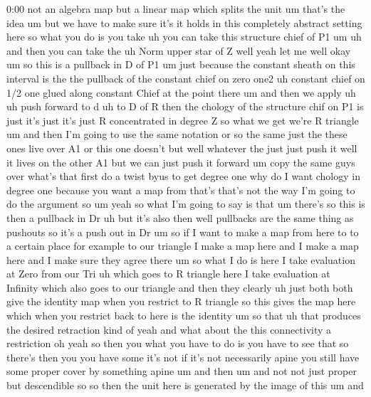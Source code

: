 \begin{unfinished}{0:00}
not  an  algebra  map  but  a  linear  map
which  splits  the  unit  um  that's  the  idea
um  but  we  have  to  make  sure  it's  it
holds  in  this  completely  abstract
setting  here  so  what  you  do  is  you  take
uh  you  can  take  this  structure  chief  of
P1
um  uh  and  then  you  can  take  the  uh  Norm
upper  star  of  Z  well  yeah  let
me  well
okay
um  so  this  is  a
pullback  in  D  of
P1
um  just  because  the  constant  sheath  on
this  interval  is  the  the  pullback  of  the
constant  chief  on  zero  one2  uh  constant
chief  on  1/2  one  glued  along  constant
Chief  at  the  point
there  um  and  then  we  apply  uh
uh  push  forward  to
d  uh  to  D  of
R  then  the  chology  of  the  structure  chif
on  P1  is  just  it's  just  it's  just  R
concentrated  in  degree  Z  so  what  we  get
we're  R
triangle  um  and  then  I'm  going  to  use
the  same  notation  or  so  the  same  just
the  these  ones  live  over  A1  or  this  one
doesn't  but  well  whatever  the  just  just
push  it  well  it  lives  on  the  other  A1
but  we  can  just  push  it  forward
um  copy  the  same  guys
over  what's
that  first  do  a  twist  byus  to  get  degree
one  why  do  I  want  chology  in  degree
one  because  you  want  a  map
from  that's  that's  not  the  way  I'm  going
to  do  the  argument  so  um  yeah  so  what
I'm  going  to  say  is  that  um  there's  so
this  is  then  a  pullback  in  Dr  uh  but
it's  also  then  well  pullbacks  are  the
same  thing  as  pushouts  so  it's  a  push
out  in  Dr  um  so  if  I  want  to  make  a  map
from  here  to  to  a  certain  place  for
example  to  our  triangle  I  make  a  map
here  and  I  make  a  map  here  and  I  make
sure  they  agree  there  um  so  what  I  do  is
here  I  take  evaluation  at
Zero  from  our  Tri  uh  which  goes  to  R
triangle  here  I  take  evaluation  at
Infinity  which  also  goes  to  our
triangle  and  then  they  clearly  uh  just
both  both  give  the  identity  map  when  you
restrict  to  R  triangle  so  this  gives  the
map  here  which  when  you  restrict  back  to
here  is  the  identity  um  so  that  uh  that
produces  the  desired
retraction  kind
of
yeah  and  what  about  the  this
connectivity  a  restriction  oh  yeah  so
then  you  what  you  have  to  do  is  you  have
to  see  that  so  there's  then  you  you  have
some  it's  not  if  it's  not  necessarily
apine  you  still  have  some  proper  cover
by  something
apine
um  and  then  um  and  not  not  just  proper
but  descendible  so  so  then  the  unit  here
is  generated  by  the  image  of  this  um  and

\end{unfinished}
